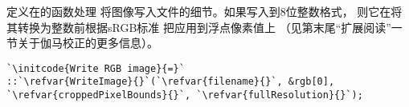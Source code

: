 定义在的函数处理
将图像写入文件的细节。如果写入到8位整数格式，
则它在将其转换为整数前根据sRGB标准
把应用到浮点像素值上
（见第末尾“扩展阅读”一节关于伽马校正的更多信息）。
\begin{lstlisting}
`\initcode{Write RGB image}{=}`
::`\refvar{WriteImage}{}`(`\refvar{filename}{}`, &rgb[0], `\refvar{croppedPixelBounds}{}`, `\refvar{fullResolution}{}`);
\end{lstlisting}